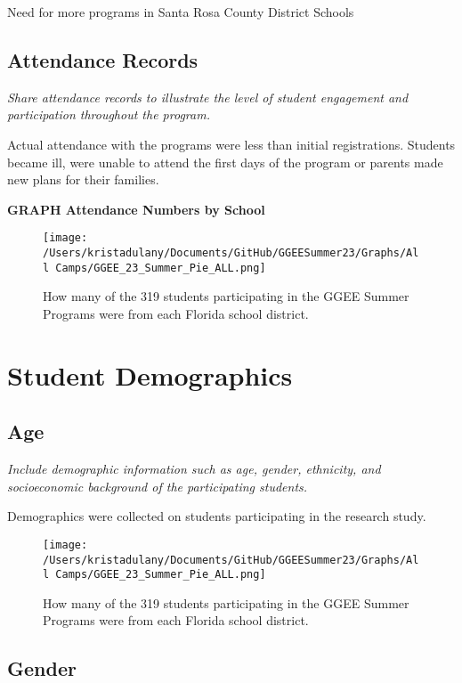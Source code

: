 \documentclass[
]{article}
\begin{document}
Need for more programs in Santa Rosa County District Schools

\hypertarget{attendance-records}{%
\subsection{Attendance Records}\label{attendance-records}}

\emph{Share attendance records to illustrate the level of student
engagement and participation throughout the program.}

Actual attendance with the programs were less than initial
registrations. Students became ill, were unable to attend the first days
of the program or parents made new plans for their families.

\textbf{GRAPH Attendance Numbers by School}

\begin{figure}
\centering
\texttt{[image: /Users/kristadulany/Documents/GitHub/GGEESummer23/Graphs/All Camps/GGEE\_23\_Summer\_Pie\_ALL.png]}
\caption{How many of the 319 students participating in the GGEE Summer
Programs were from each Florida school district.}
\end{figure}

\hypertarget{student-demographics}{%
\section{Student Demographics}\label{student-demographics}}

\hypertarget{age}{%
\subsection{Age}\label{age}}

\emph{Include demographic information such as age, gender, ethnicity,
and socioeconomic background of the participating students.}

Demographics were collected on students participating in the research
study.

\begin{figure}
\centering
\texttt{[image: /Users/kristadulany/Documents/GitHub/GGEESummer23/Graphs/All Camps/GGEE\_23\_Summer\_Pie\_ALL.png]}
\caption{How many of the 319 students participating in the GGEE Summer
Programs were from each Florida school district.}
\end{figure}

\hypertarget{gender}{%
\subsection{Gender}\label{gender}}
\end{document}
